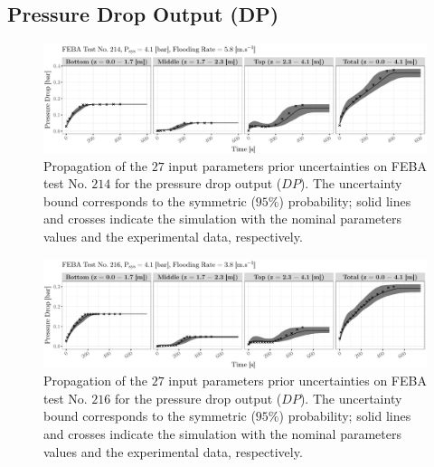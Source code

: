 \subsection{Pressure Drop Output (DP)}\label{app:tbl_results_uq_feba_dp}

\begin{figure}[bth]
    \centering
    \includegraphics[width=1.0\textwidth]{../figures/chapter2/figures/plotTraceUQPriorDP214}
    \caption[Propagation of the $27$ input parameters prior uncertainties on FEBA test No. $214$ for the pressure drop output ($DP$).]{Propagation of the $27$ input parameters prior uncertainties on FEBA test No. $214$ for the pressure drop output ($DP$). The uncertainty bound corresponds to the symmetric ($95\%$) probability; solid lines and crosses indicate the simulation with the nominal parameters values and the experimental data, respectively.}
    \label{fig:ch2_plot_trace_uq_prior_dp_214}
\end{figure}

\begin{figure}[bth]
    \centering
    \includegraphics[width=1.0\textwidth]{../figures/chapter2/figures/plotTraceUQPriorDP216}
    \caption[Propagation of the $27$ input parameters prior uncertainties on FEBA test No. $216$ for the pressure drop output ($DP$).]{Propagation of the $27$ input parameters prior uncertainties on FEBA test No. $216$ for the pressure drop output ($DP$). The uncertainty bound corresponds to the symmetric ($95\%$) probability; solid lines and crosses indicate the simulation with the nominal parameters values and the experimental data, respectively.}
    \label{fig:ch2_plot_trace_uq_prior_dp_216}
\end{figure}


